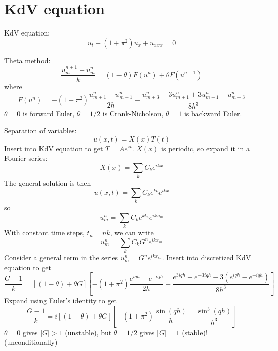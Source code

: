 \section{KdV equation}

KdV equation:
\begin{equation}
u_t + (1+\pi^2)u_x + u_{xxx} = 0
\end{equation}

Theta method:
\begin{equation}
\frac{u_m^{n+1} - u_m^n}{k} = (1-\theta) F(u^n) + \theta F(u^{n+1})
\end{equation}
where
\begin{equation}
F(u^n) = -(1+\pi^2) \frac{u_{m+1}^n-u_{m-1}^n}{2h} - \frac{u_{m+3}^n-3u_{m+1}^n+3u_{m-1}^n-u_{m-3}^n}{8h^3}
\end{equation}
$\theta = 0$ is forward Euler, $\theta = 1/2$ is Crank-Nicholson, $\theta = 1$ is backward Euler.

Separation of variables:
\begin{equation}
u(x, t) = X(x) T(t)
\end{equation}
Insert into KdV equation to get $T = A e^{zt}$.
$X(x)$ is periodic, so expand it in a Fourier series:
\begin{equation}
X(x) = \sum_k C_k e^{ikx}
\end{equation}
The general solution is then
\begin{equation}
u(x, t) = \sum_k C_k e^{kt} e^{ikx}
\end{equation}
so
\begin{equation}
u_m^n = \sum_k C_k e^{kt_n} e^{ikx_m}
\end{equation}
With constant time steps, $t_n = nk$, we can write
\begin{equation}
u_m^n = \sum_k C_k G^n e^{ikx_m}
\end{equation}
Consider a general term in the series $u_m^n = G^n e^{ikx_m}$. Insert into discretized KdV equation to get
\begin{equation}
\frac{G-1}{k} = [(1-\theta)+\theta G] [-(1+\pi^2) \frac{e^{iqh}-e^{-iqh}}{2h} - \frac{e^{3iqh}-e^{-3iqh}-3(e^{iqh}-e^{-iqh})}{8h^3}]
\end{equation}
Expand using Euler's identity to get
\begin{equation}
\frac{G-1}{k} = i [(1-\theta)+\theta G] [-(1+\pi^2) \frac{\sin(qh)}{h} - \frac{\sin^3(qh)}{h^3}]
\end{equation}
$\theta = 0$ gives $|G| > 1$ (unstable), but $\theta = 1/2$ gives $|G| = 1$ (stable)! (unconditionally)
